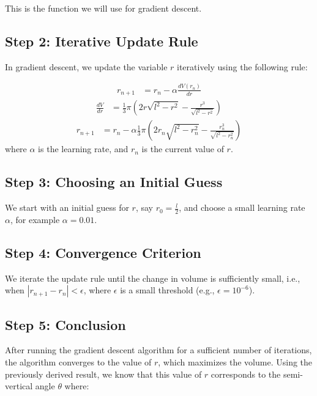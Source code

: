 \documentclass[journal]{IEEEtran}
\begin{document}
This is the function we will use for gradient descent.

\subsection*{Step 2: Iterative Update Rule}

In gradient descent, we update the variable \( r \) iteratively using the following rule:

\begin{align}
r_{n+1} &= r_n - \alpha \frac{dV(r_n)}{dr}
\end{align}
\begin{align}
\frac{dV}{dr} &= \frac{1}{3} \pi \left( 2r \sqrt{l^2 - r^2} - \frac{r^3}{\sqrt{l^2 - r^2}} \right)
\end{align}
\begin{align}
r_{n+1} &= r_n - \alpha \frac{1}{3} \pi \left( 2r_n \sqrt{l^2 - r_n^2} - \frac{r_n^3}{\sqrt{l^2 - r_n^2}} \right)
\end{align}
where \( \alpha \) is the learning rate, and \( r_n \) is the current value of \( r \).

\subsection*{Step 3: Choosing an Initial Guess}

We start with an initial guess for \( r \), say \( r_0 = \frac{l}{2} \), and choose a small learning rate \( \alpha \), for example \( \alpha = 0.01 \).

\subsection*{Step 4: Convergence Criterion}

We iterate the update rule until the change in volume is sufficiently small, i.e., when \( \left| r_{n+1} - r_n \right| < \epsilon \), where \( \epsilon \) is a small threshold (e.g., \( \epsilon = 10^{-6} \)).

\subsection*{Step 5: Conclusion}

After running the gradient descent algorithm for a sufficient number of iterations, the algorithm converges to the value of \( r \), which maximizes the volume. Using the previously derived result, we know that this value of \( r \) corresponds to the semi-vertical angle \( \theta \) where:
\end{document}
